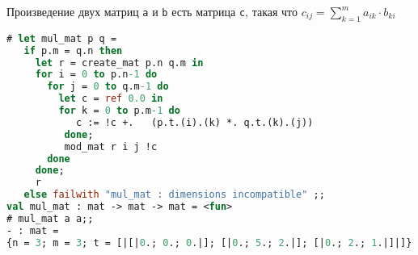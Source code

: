 Произведение двух матриц \texttt{a} и \texttt{b} есть матрица \texttt{c}, такая
что $c_{ij} = \sum_{k = 1}^m a_{ik} \cdot b_{ki}$

\begin{lstlisting}[language=OCaml]
# let mul_mat p q =
   if p.m = q.n then
     let r = create_mat p.n q.m in
     for i = 0 to p.n-1 do
       for j = 0 to q.m-1 do
         let c = ref 0.0 in
         for k = 0 to p.m-1 do
            c := !c +.   (p.t.(i).(k) *. q.t.(k).(j))
          done;
          mod_mat r i j !c
       done
     done;
     r
   else failwith "mul_mat : dimensions incompatible" ;;
val mul_mat : mat -> mat -> mat = <fun>
# mul_mat a a;;
- : mat =
{n = 3; m = 3; t = [|[|0.; 0.; 0.|]; [|0.; 5.; 2.|]; [|0.; 2.; 1.|]|]}
\end{lstlisting}
